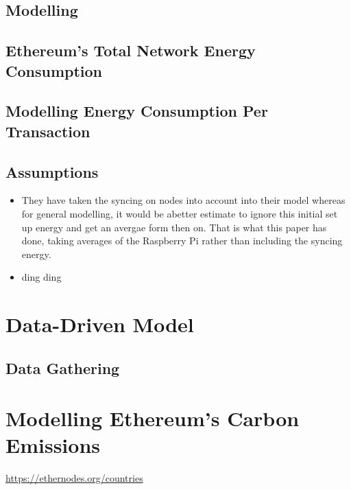 \subsection {Modelling }
\subsection{Ethereum's Total Network Energy Consumption}

\subsection {Modelling Energy Consumption Per Transaction}

\subsection{Assumptions}

\begin{itemize}
    \item They have taken the syncing on nodes into account into their model whereas for general modelling, it would be  abetter estimate to ignore this initial set up energy and get an avergae form then on. That is what this paper has done, taking averages of the Raspberry Pi rather than including the syncing energy.
    \item ding ding
\end{itemize}


\section{ Data-Driven Model}
\subsection{Data Gathering}






\section {Modelling Ethereum's Carbon Emissions}
\url{https://ethernodes.org/countries}

